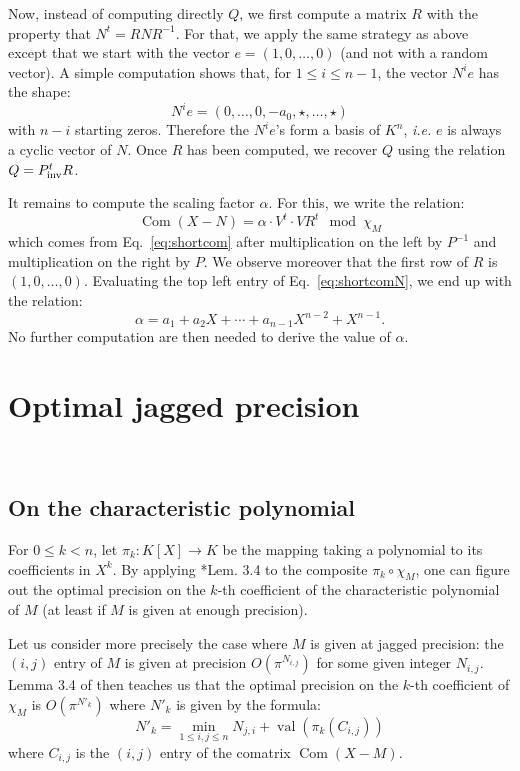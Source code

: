\documentclass{sig-alternate-05-2015}
\DeclareMathOperator{\val}{val}
\DeclareMathOperator{\com}{Com}
\newcommand{\inv}{\text{\rm inv}}
\def\todo#1{\ \!\!{\color{red} #1}}
\begin{document}
Now, instead of computing directly $Q$, we first compute a matrix $R$ 
with the property that $N^t = R N R^{-1}$. For that, we apply the same
strategy as above except that we start with the vector $e = (1, 0, 
\ldots, 0)$ (and not with a random vector). A simple computation shows
that, for $1 \leq i \leq n{-}1$, the vector $N^i e$ has the shape:
$$N^i e = (0, \ldots, 0, -a_0, \star, \ldots, \star)$$
with $n{-}i$ starting zeros. Therefore the $N^i e$'s form a basis of
$K^n$, \emph{i.e.} $e$ is always a cyclic vector of $N$. Once $R$ has
been computed, we recover $Q$ using the relation $Q = P_\inv^t R$.

It remains to compute the scaling factor $\alpha$. For this, we write
the relation:
\begin{equation}
\label{eq:shortcomN}
\com(X{-}N) = \alpha \cdot V^t \cdot V R^t \mod \chi_M
\end{equation}
which comes from Eq.~\eqref{eq:shortcom} after multiplication on the 
left by $P^{-1}$ and multiplication on the right by $P$. We observe
moreover that the first row of $R$ is $(1, 0, \ldots, 0)$. Evaluating
the top left entry of Eq.~\eqref{eq:shortcomN}, we end up with the 
relation:
$$\alpha = a_1 + a_2 X + \cdots + a_{n-1} X^{n-2} + X^{n-1}.$$
No further computation are then needed to derive the value of $\alpha$.

\section{Optimal jagged precision}
\label{sec:optjagged}

\todo{Write a small introduction}

\subsection{On the characteristic polynomial}

For $0 \leq k < n$, let $\pi_k : K[X] \to K$ be the mapping taking a 
polynomial to its coefficients in $X^k$. By applying 
\cite{caruso-roe-vaccon:14a}*{Lem. 3.4} to the composite $\pi_k 
\circ \chi_M$, one can figure out the optimal precision on the
$k$-th coefficient of the characteristic polynomial of $M$ (at
least if $M$ is given at enough precision).

Let us consider more precisely the case where $M$ is given at 
jagged precision: the $(i,j)$ entry of $M$ is given at precision 
$O(\pi^{N_{i,j}})$ for some given integer $N_{i,j}$. 
Lemma 3.4 of \cite{caruso-roe-vaccon:14a} then teaches us that
the optimal precision on the $k$-th coefficient of $\chi_M$ is 
$O(\pi^{N'_k})$ where $N'_k$ is given by the formula:
\begin{equation}
\label{eq:optjagged}
N'_k = \min_{1 \leq i, j\leq n} N_{j,i} + \val(\pi_k(C_{i,j}))
\end{equation}
where $C_{i,j}$ is the $(i,j)$ entry of the comatrix $\com(X{-}M)$.
\end{document}
